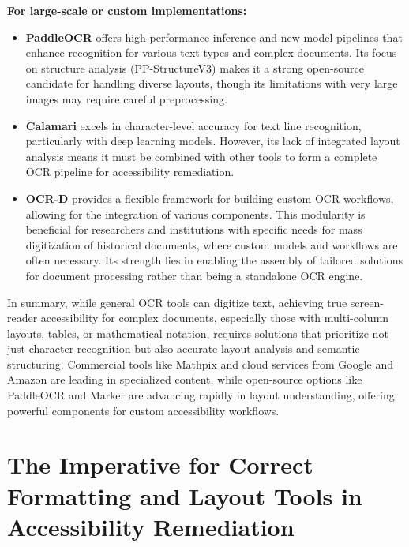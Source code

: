 \textbf{For large-scale or custom implementations:}
\begin{itemize}
    \item \textbf{PaddleOCR} offers high-performance inference and new model pipelines that enhance recognition for various text types and complex documents. Its focus on structure analysis (PP-StructureV3) makes it a strong open-source candidate for handling diverse layouts, though its limitations with very large images may require careful preprocessing.
    \item \textbf{Calamari} excels in character-level accuracy for text line recognition, particularly with deep learning models. However, its lack of integrated layout analysis means it must be combined with other tools to form a complete OCR pipeline for accessibility remediation.
    \item \textbf{OCR-D} provides a flexible framework for building custom OCR workflows, allowing for the integration of various components. This modularity is beneficial for researchers and institutions with specific needs for mass digitization of historical documents, where custom models and workflows are often necessary. Its strength lies in enabling the assembly of tailored solutions for document processing rather than being a standalone OCR engine.
\end{itemize}

In summary, while general OCR tools can digitize text, achieving true screen-reader accessibility for complex documents, especially those with multi-column layouts, tables, or mathematical notation, requires solutions that prioritize not just character recognition but also accurate layout analysis and semantic structuring. Commercial tools like Mathpix and cloud services from Google and Amazon are leading in specialized content, while open-source options like PaddleOCR and Marker are advancing rapidly in layout understanding, offering powerful components for custom accessibility workflows.

\section{The Imperative for Correct Formatting and Layout Tools in Accessibility Remediation}
\label{sec:ocr-formatting-remediation}

